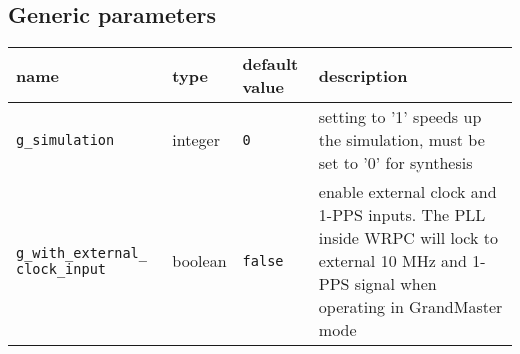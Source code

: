 \subsection{Generic parameters}
\label{sec:generics}

\begin{center}
  \begin{tabular}{|p{4cm}|p{2cm}|p{1.5cm}|p{6.5cm}|}
    \hline {\bf name} & {\bf type} & {\bf default value} & {\bf description} \\
    \hline
    \hline
    \texttt{g\_simulation} & integer & \texttt{0} & setting to '1' speeds up the simulation,
    must be set to '0' for synthesis\\
    \hline
    \texttt{g\_with\_external\_ \linebreak clock\_input} & boolean & \texttt{false} &
    enable external clock and 1-PPS inputs. The PLL inside WRPC will lock to
    external 10 MHz and 1-PPS signal when operating in GrandMaster mode\\
    \hline
  \end{tabular}
\end{center}
